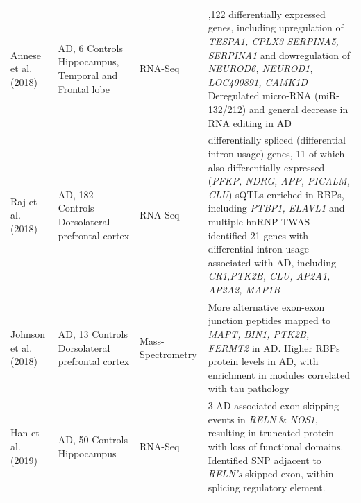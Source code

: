 \begin{changemargin}{1.5cm}
\begin{landscape}
\begin{longtable}[c]{p{3cm}p{4cm}p{3cm}p{16cm}}
			\centering Annese et al. (2018)\cite{Annese2018} &
			\centering 6 AD, 6 Controls \newline Hippocampus, Temporal and Frontal lobe &
			\centering RNA-Seq &
			\tabitem 2,122 differentially expressed genes, including upregulation of \textit{TESPA1, CPLX3 SERPINA5, SERPINA1} and dowregulation of \textit{NEUROD6, NEUROD1, LOC400891, CAMK1D} \newline
			\tabitem Deregulated micro-RNA (miR-132/212) and general decrease in RNA editing in AD \\
			\hdashline[0.5pt/5pt]
			
			\centering Raj et al. \newline (2018)\cite{Raj2018} &
			\centering 268 AD, 182 Controls \newline Dorsolateral prefrontal cortex &
			\centering RNA-Seq &
			\tabitem 84 differentially spliced (differential intron usage) genes, 11 of which also differentially expressed (\textit{PFKP, NDRG, APP, PICALM, CLU}) \newline
			\tabitem sQTLs enriched in RBPs, including \textit{PTBP1, ELAVL1} and multiple hnRNP \newline
			\tabitem TWAS identified 21 genes with differential intron usage associated with AD, including \textit{CR1,PTK2B, CLU, AP2A1, AP2A2, MAP1B} \\
			\hdashline[0.5pt/5pt]
			
			\centering Johnson et al. \newline (2018)\cite{Johnson2018} &
			\centering 20 AD, 13 Controls \newline Dorsolateral prefrontal cortex &
			\centering Mass-Spectrometry &
			\tabitem More alternative exon-exon junction peptides mapped to \textit{MAPT, BIN1, PTK2B, FERMT2} in AD. \newline 
			\tabitem Higher RBPs protein levels in AD, with enrichment in modules correlated with tau pathology \\
			\hdashline[0.5pt/5pt]	
			
			\centering Han et al. (2019) \cite{Han2019} &
			\centering 24 AD, 50 Controls \newline Hippocampus &
			\centering RNA-Seq &
			3 AD-associated exon skipping events in \textit{RELN} \& \textit{NOS1}, resulting in truncated protein with loss of functional domains. Identified SNP adjacent to \textit{RELN's} skipped exon, within splicing regulatory element. \\
			

\end{longtable}
\end{landscape}
\end{changemargin}
